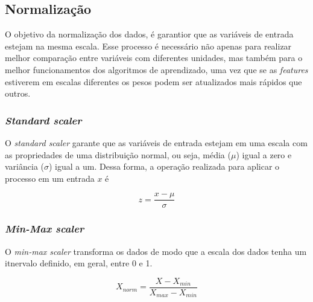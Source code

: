\subsection{Normalização}

O objetivo da normalização dos dados, é garantior que as variáveis de entrada 
estejam na mesma escala. Esse processo é necessário não apenas para realizar melhor comparação entre variáveis 
com diferentes unidades, mas também para o melhor funcionamentos dos algoritmos 
de aprendizado, uma vez que se as \textit{features} estiverem em escalas diferentes
os pesos podem ser atualizados mais rápidos que outros.

\subsubsection{\textit{Standard scaler}}

O \textit{standard scaler} garante que as variáveis de entrada estejam em uma 
escala com as propriedades de uma distribuição normal, ou seja, média ($\mu$)
igual a zero e variância ($\sigma$) igual a um. Dessa forma, a operação 
realizada para aplicar o processo em um entrada $x$ é

\begin{equation}
  z = \frac{x - \mu}{\sigma}
\end{equation}

\subsubsection{\textit{Min-Max scaler}}

O \textit{min-max scaler} transforma os dados de modo que a 
escala dos dados tenha um itnervalo definido, em geral, entre
0 e 1.

\begin{equation}
  X_{norm} = \frac{X - X_{min}}{X_{max} - X_{min}}
\end{equation}